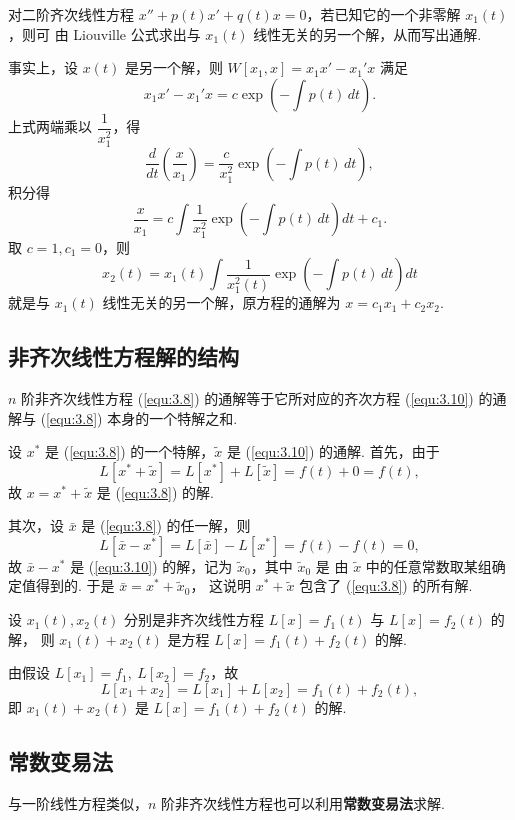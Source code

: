 \begin{rmk}
对二阶齐次线性方程 $x''+p(t)x'+q(t)x=0$，若已知它的一个非零解 $x_1(t)$，则可
由 Liouville 公式求出与 $x_1(t)$ 线性无关的另一个解，从而写出通解.

事实上，设 $x(t)$ 是另一个解，则 $W[x_1,x]=x_1x'-x_1'x$ 满足
\[
x_1x'-x_1'x=c\exp\left(-\int p(t)\,dt\right).
\]
上式两端乘以 $\dfrac{1}{x_1^2}$，得
\[
\frac{d}{dt}\left(\frac{x}{x_1}\right)
=\frac{c}{x_1^2}\exp\left(-\int p(t)\,dt\right),
\]
积分得
\[
\frac{x}{x_1}=c\int\frac{1}{x_1^2}\exp\left(-\int p(t)\,dt\right)dt+c_1.
\]
取 $c=1,c_1=0$，则
\[
x_2(t)=x_1(t)\int\frac{1}{x_1^2(t)}
\exp\left(-\int p(t)\,dt\right)dt
\]
就是与 $x_1(t)$ 线性无关的另一个解，原方程的通解为 $x=c_1x_1+c_2x_2$.
\end{rmk}

\subsection{非齐次线性方程解的结构}
\begin{thm}\label{thm:3.2.10}
$n$ 阶非齐次线性方程 (\ref{equ:3.8}) 的通解等于它所对应的齐次方程
(\ref{equ:3.10}) 的通解与 (\ref{equ:3.8}) 本身的一个特解之和.
\end{thm}
\begin{pf1}
设 $x^*$ 是 (\ref{equ:3.8}) 的一个特解，$\tilde{x}$ 是 (\ref{equ:3.10}) 的通解.
首先，由于
\[
L[x^*+\tilde{x}]=L[x^*]+L[\tilde{x}]=f(t)+0=f(t),
\]
故 $x=x^*+\tilde{x}$ 是 (\ref{equ:3.8}) 的解.

其次，设 $\bar{x}$ 是 (\ref{equ:3.8}) 的任一解，则
\[
L[\bar{x}-x^*]=L[\bar{x}]-L[x^*]=f(t)-f(t)=0,
\]
故 $\bar{x}-x^*$ 是 (\ref{equ:3.10}) 的解，记为 $\tilde{x}_0$，其中 $\tilde{x}_0$ 是
由 $\tilde{x}$ 中的任意常数取某组确定值得到的. 于是 $\bar{x}=x^*+\tilde{x}_0$，
这说明 $x^*+\tilde{x}$ 包含了 (\ref{equ:3.8}) 的所有解.
\end{pf1}

\begin{thm}[(叠加原理)]\label{thm:3.2.11}
设 $x_1(t),x_2(t)$ 分别是非齐次线性方程 $L[x]=f_1(t)$ 与 $L[x]=f_2(t)$ 的解，
则 $x_1(t)+x_2(t)$ 是方程 $L[x]=f_1(t)+f_2(t)$ 的解.
\end{thm}
\begin{pf1}
由假设 $L[x_1]=f_1,\ L[x_2]=f_2$，故
\[
L[x_1+x_2]=L[x_1]+L[x_2]=f_1(t)+f_2(t),
\]
即 $x_1(t)+x_2(t)$ 是 $L[x]=f_1(t)+f_2(t)$ 的解.
\end{pf1}

\subsection{常数变易法}
与一阶线性方程类似，$n$ 阶非齐次线性方程也可以利用\textbf{常数变易法}求解.

